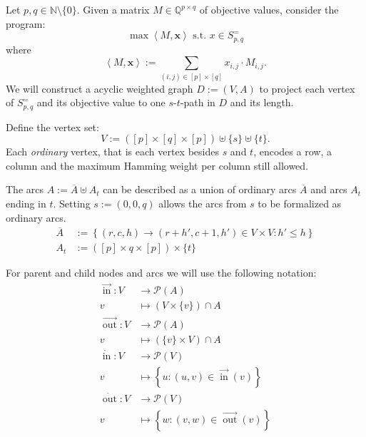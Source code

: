 \documentclass[a4paper]{amsart}
\theoremstyle{lemma}
\theoremstyle{definition}
\theoremstyle{remark}
\DeclareMathOperator{\In}{in}
\DeclareMathOperator{\Out}{out}
\newcommand{\ina}{\ensuremath{\vec{\In}}}
\newcommand{\outa}{\ensuremath{\vec{\Out}}}
\newcommand{\inv}{\ensuremath{\dot{\In}}}
\newcommand{\outv}{\ensuremath{\dot{\Out}}}
\begin{document}
Let \(p, q \in \mathbb{N} \setminus \{0\}\).  Given a matrix \(M \in
\mathbb{Q}^{p \times q}\) of objective values, consider the program:
\begin{equation}
\label{optS}
\max \left<M, \mathbf{x} \right>  \text{ s.t. } x \in S^=_{p, q}
\end{equation}
where \[\left<M, \mathbf{x} \right> := \sum_{(i, j)\in [p]\times [q]} x_{i, j}\cdot M_{i, j}\text{.}\]
We will construct a acyclic weighted graph \(D := (V, A)\) to project each vertex of
\(S^=_{p, q}\) and its objective value to one \(s\)-\(t\)-path in \(D\) and its length.

Define the vertex set:
\[V := \left( [p]\times [q] \times [p]\right) \uplus \{s\} \uplus \{t\}\text{.}\] 
Each \textit{ordinary} vertex, that is
each vertex besides \(s\) and \(t\), encodes a row, a column and the
maximum Hamming weight per column still allowed.

The arcs \(A := \overline{A} \uplus A_t\) can be described as a union
of ordinary arcs \(\overline{A}\) and arcs \(A_t\) ending in \(t\).  Setting
\(s:=(0, 0, q)\) allows the arcs from $s$ to be formalized as
ordinary arcs.
\begin{align}
  \overline{A} &:=
  \left\{ \left(r, c, h\right) \rightarrow \left(r+h', c+1, h'\right) \in V \times V \colon
  h' \leq h \right\} \\
  A_t &:= ([p] \times {q} \times [p]) \times \{t\}
\end{align}

For parent and child nodes and arcs we will use the following notation:
\begin{align*}
\ina\colon  V &\to \mathcal{P}(A) \\
v &\mapsto \left(V \times \{v\}\right) \cap A\\
\outa\colon  V &\to \mathcal{P}(A) \\
v &\mapsto \left(\{v\} \times V\right) \cap A\\
\inv\colon  V &\to \mathcal{P}(V) \\
v &\mapsto \left\{ u \colon \left(u, v\right) \in \ina(v) \right\}\\
\outv\colon  V &\to \mathcal{P}(V) \\
v &\mapsto \left\{w \colon \left(v, w\right) \in \outa\left(v\right) \right\}\\
\end{align*}
\end{document}
